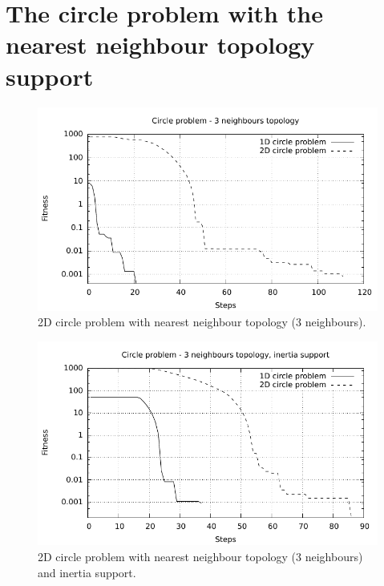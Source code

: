 \section{The circle problem with the nearest neighbour topology support}

\begin{figure}[!h]
	\centering
		\includegraphics[width=15cm]{img/2a.pdf}
	\caption{2D circle problem with nearest neighbour topology (3 neighbours).}
	\label{fig:2Dcircle_nntopology}
\end{figure}

\begin{figure}[!h]
	\centering
		\includegraphics[width=15cm]{img/2b.pdf}
	\caption{2D circle problem with nearest neighbour topology (3 neighbours) and inertia support.}
	\label{fig:2Dcircle_nntopology_inertia}
\end{figure}